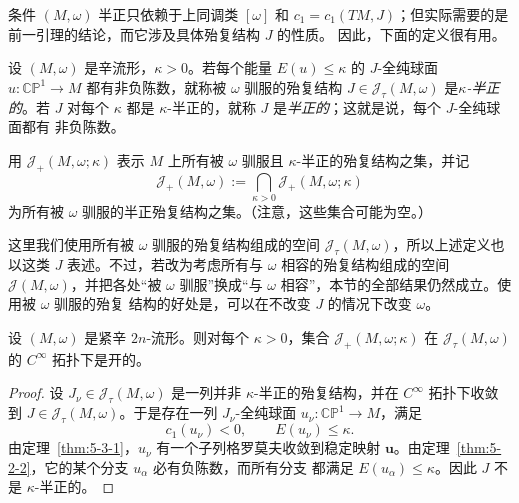 条件 $(M,\omega)$ 半正只依赖于上同调类 $[\omega]$ 和
$c_1=c_1(TM,J)$；但实际需要的是前一引理的结论，而它涉及具体殆复结构 $J$ 的性质。
因此，下面的定义很有用。

\begin{definition}\label{def:6-4-5}
设 $(M,\omega)$ 是辛流形，$\kappa>0$。若每个能量 $E(u)\le\kappa$ 的
$J$-全纯球面 $u:\mathbb{CP}^1\to M$ 都有非负陈数，就称被 $\omega$ 驯服的殆复结构
$J\in\mathcal J_\tau(M,\omega)$ 是\emph{$\kappa$-半正的}。若 $J$ 对每个 $\kappa$
都是 $\kappa$-半正的，就称 $J$ 是\emph{半正的}；这就是说，每个 $J$-全纯球面都有
非负陈数。
\end{definition}

用 $\mathcal J_+(M,\omega;\kappa)$ 表示 $M$ 上所有被 $\omega$ 驯服且
$\kappa$-半正的殆复结构之集，并记
\[
  \mathcal J_+(M,\omega)
  :=\bigcap_{\kappa>0}\mathcal J_+(M,\omega;\kappa)
\]
为所有被 $\omega$ 驯服的半正殆复结构之集。（注意，这些集合可能为空。）

\begin{remark}\label{rem:6-4-6}
这里我们使用所有被 $\omega$ 驯服的殆复结构组成的空间
$\mathcal J_\tau(M,\omega)$，所以上述定义也以这类 $J$ 表述。不过，若改为考虑所有与
$\omega$ 相容的殆复结构组成的空间 $\mathcal J(M,\omega)$，并把各处“被 $\omega$
驯服”换成“与 $\omega$ 相容”，本节的全部结果仍然成立。使用被 $\omega$ 驯服的殆复
结构的好处是，可以在不改变 $J$ 的情况下改变 $\omega$。
\end{remark}

\begin{lemma}\label{lem:6-4-7}
设 $(M,\omega)$ 是紧辛 $2n$-流形。则对每个 $\kappa>0$，集合
$\mathcal J_+(M,\omega;\kappa)$ 在 $\mathcal J_\tau(M,\omega)$ 的
$C^\infty$ 拓扑下是开的。
\end{lemma}

\begin{proof}
设 $J_\nu\in\mathcal J_\tau(M,\omega)$ 是一列并非 $\kappa$-半正的殆复结构，并在
$C^\infty$ 拓扑下收敛到 $J\in\mathcal J_\tau(M,\omega)$。于是存在一列
$J_\nu$-全纯球面 $u_\nu:\mathbb{CP}^1\to M$，满足
\[
  c_1(u_\nu)<0,\qquad E(u_\nu)\le\kappa.
\]
由定理~\ref{thm:5-3-1}，$u_\nu$ 有一个子列格罗莫夫收敛到稳定映射
$\mathbf u$。由定理~\ref{thm:5-2-2}，它的某个分支 $u_\alpha$ 必有负陈数，而所有分支
都满足 $E(u_\alpha)\le\kappa$。因此 $J$ 不是 $\kappa$-半正的。
\end{proof}

